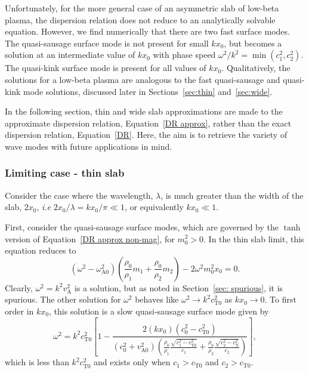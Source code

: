 \documentclass[12pt]{../style-files/ociamthesis}
\begin{document}
Unfortunately, for the more general case of an asymmetric slab of low-beta plasma, the dispersion relation does not reduce to an analytically solvable equation. However, we find numerically that there are two fast surface modes. The quasi-sausage surface mode is not present for small $kx_0$, but becomes a solution at an intermediate value of $kx_0$ with phase speed $\omega^2/k^2=\min{(c_1^2,c_2^2)}$. The quasi-kink surface mode is present for all values of $kx_0$. Qualitatively, the solutions for a low-beta plasma are analogous to the fast quasi-sausage and quasi-kink mode solutions, discussed later in Sections~\ref{sec:thin} and~\ref{sec:wide}.

In the following section, thin and wide slab approximations are made to the approximate dispersion relation, Equation~\eqref{DR approx}, rather than the exact dispersion relation, Equation~\eqref{DR}. Here, the aim is to retrieve the variety of wave modes with future applications in mind.


\subsubsection{Limiting case - thin slab} \label{sec: thin slab}

Consider the case where the wavelength, $\lambda$, is much greater than the width of the slab, $2x_0$, \textit{i.e} $2x_0/\lambda = kx_0/\pi \ll 1$, or equivalently $kx_0 \ll 1$.

First, consider the quasi-sausage surface modes, which are governed by the $\tanh$ version of Equation~\eqref{DR approx non-mag}, for $m_0^2 > 0$. In the thin slab limit, this equation reduces to
\begin{equation}
(\omega^2 - \omega_\textrm{A0}^2)\left(\frac{\rho_0}{\rho_1}m_1 + \frac{\rho_0}{\rho_2}m_2\right) -  2\omega^2m_0^2x_0 = 0. \label{thin}
\end{equation}
Clearly, $\omega^2={k^2v_\textrm{A}^2}$ is a solution, but as noted in Section~\ref{sec: spurious}, it is spurious. The other solution for $\omega^2$ behaves like $\omega^2 \to k^2c_\textrm{T0}^2$ as $kx_0 \to 0$. To first order in $kx_0$, this solution is a slow quasi-sausage surface mode given by
\begin{equation}
\omega^2 = k^2c_\textrm{T0}^2 \left[1 - \frac{2(kx_0)(c_0^2 - c_\textrm{T0}^2)}{(c_0^2 + v_\textrm{A0}^2)\left(\frac{\rho_0}{\rho_1}\frac{\sqrt{c_1^2 - c_\textrm{T0}^2}}{c_1} + \frac{\rho_0}{\rho_2}\frac{\sqrt{c_2^2 - c_\textrm{T}^2}}{c_2}\right)}\right],
\label{thin slab slow saus surf}
\end{equation}
which is less than $k^2c_\textrm{T0}^2$ and exists only when $c_1 > c_\textrm{T0}$ and $c_2 > c_\textrm{T0}$. 
\end{document}
